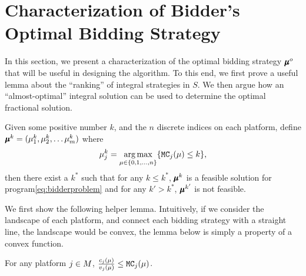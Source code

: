 \section{Characterization of Bidder's Optimal Bidding Strategy}
In this section, we present a characterization of the optimal bidding strategy $\mathbf{\pmb{\mu}}^o$ that will be useful in designing the algorithm. To this end, we first prove a useful lemma about the ``ranking'' of integral strategies in $S$. We then argue how an ``almost-optimal'' integral solution can be used to determine the optimal fractional solution.
\begin{lemma}\label{lem:opt}
Given some positive number $k$, and the $n$ discrete indices on each platform,
define $\pmb{\mu}^k = (\mu^k_1, \mu^k_2, \dots \mu^k_m)$ where
\[\mu^k_j = \operatorname*{arg\,max}_{\mu \in \{0,1,\dots,n\}}\{\texttt{MC}_j(\mu)\leq k\},\]
then there exist a $k^*$ such that for any $k \leq k^*$, $\pmb{\mu}^k$ is a feasible solution for program\eqref{eq:bidderproblem} and for any $k' > k^*$, $\pmb{\mu}^{k'}$ is not feasible.
\end{lemma}
We first show the following helper lemma. Intuitively, if we consider the landscape of each platform, and connect each bidding strategy with a straight line, the landscape would be convex, the lemma below is simply a property of a convex function. 
\begin{lemma}\label{lem:helper}
For any platform $j \in M$,
$\frac{c_j(\mu)}{v_j(\mu)} \leq \texttt{MC}_j(\mu)$.
\end{lemma}

